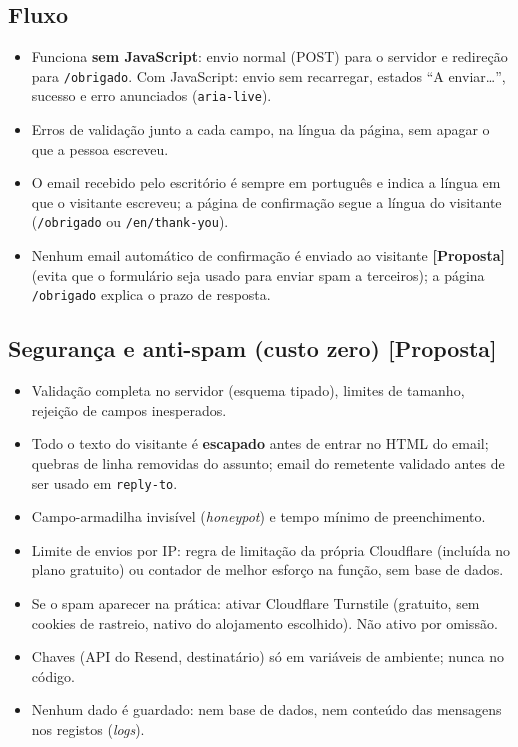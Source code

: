 \documentclass[11pt,a4paper]{article}
\newcommand{\proposta}{\textcolor{bronze}{\textbf{[Proposta]}}}
\begin{document}
\subsection{Fluxo}
\begin{itemize}
  \item Funciona \textbf{sem JavaScript}: envio normal (POST) para o servidor e redireção para \texttt{/obrigado}. Com JavaScript: envio sem recarregar, estados ``A enviar…'', sucesso e erro anunciados (\texttt{aria-live}).
  \item Erros de validação junto a cada campo, na língua da página, sem apagar o que a pessoa escreveu.
  \item O email recebido pelo escritório é sempre em português e indica a língua em que o visitante escreveu; a página de confirmação segue a língua do visitante (\texttt{/obrigado} ou \texttt{/en/thank-you}).
  \item Nenhum email automático de confirmação é enviado ao visitante \proposta{} (evita que o formulário seja usado para enviar spam a terceiros); a página \texttt{/obrigado} explica o prazo de resposta.
\end{itemize}

\subsection{Segurança e anti-spam (custo zero) \proposta}
\begin{itemize}
  \item Validação completa no servidor (esquema tipado), limites de tamanho, rejeição de campos inesperados.
  \item Todo o texto do visitante é \textbf{escapado} antes de entrar no HTML do email; quebras de linha removidas do assunto; email do remetente validado antes de ser usado em \texttt{reply-to}.
  \item Campo-armadilha invisível (\textit{honeypot}) e tempo mínimo de preenchimento.
  \item Limite de envios por IP: regra de limitação da própria Cloudflare (incluída no plano gratuito) ou contador de melhor esforço na função, sem base de dados.
  \item Se o spam aparecer na prática: ativar Cloudflare Turnstile (gratuito, sem cookies de rastreio, nativo do alojamento escolhido). Não ativo por omissão.
  \item Chaves (API do Resend, destinatário) só em variáveis de ambiente; nunca no código.
  \item Nenhum dado é guardado: nem base de dados, nem conteúdo das mensagens nos registos (\textit{logs}).
\end{itemize}
\end{document}
